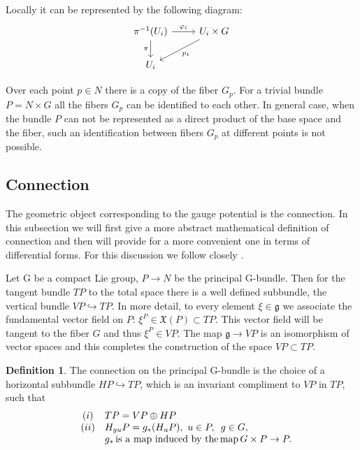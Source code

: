 \documentclass[11pt]{report}
\theoremstyle{plain}
\theoremstyle{definition}
\newtheorem{defn}[thm]{Definition}
\theoremstyle{remark}
\theoremstyle{remark}
\numberwithin{equation}{section}
\begin{document}
Locally it can be represented by the following diagram:
 \[
\begin{tikzcd}
\pi^{-1}(U_i) \arrow{r}{\varphi_i} \arrow[swap]{d}{\pi} & U_i\times G \arrow{dl}{p_1} \\
U_i
\end{tikzcd}
\]

Over each point $p\in N$ there is a copy of the fiber $G_p$. For a trivial bundle $P = N\times G$ all the fibers $G_p$ can be identified to each other. In general case, when the bundle $P$ can not be represented as a direct product of the base space and the fiber, such an identification between fibers $G_p$ at different points is not possible. 

\subsection{Connection}
The geometric object corresponding to the gauge potential is the connection. In this subsection we will first give a more abstract mathematical definition of connection and then will provide for a more convenient one in terms of differential forms. For this discussion we follow closely \cite{Nakahara}.

Let G be a compact Lie group, $P\to N$ be the principal G-bundle. Then for the tangent bundle $TP$ to the total space there is a well defined subbundle, the vertical bundle $VP\hookrightarrow TP$. In more detail,  to every element $\xi \in \mathfrak{g}$ we associate the fundamental vector field on $P$: $\xi^P \in \mathfrak{X}(P) \subset TP$. This vector field will be tangent to the fiber $G$ and thus $\xi^P \in VP$. The map $\mathfrak{g} \to VP$ is an isomorphism of vector spaces and this completes the construction of the space $VP \subset TP$. 

\begin{defn}\label{hor}
The connection on the principal G-bundle is the choice of a horizontal subbundle $HP \hookrightarrow TP$, which is an invariant compliment to $VP$ in $TP$, such that 
\[\begin{array}{lcl}
 &(i)  & TP = VP \oplus HP\\
 & (ii) & H_{gu}P = g_*(H_uP), \, \,  u\in P, \,\, \,  g\in G,\\
 & \,& g_* \, {\rm is \,  \, a  \, \, map \, \, induced \, \, by \, \,  the \, map} \, G \times P \to P.\\
 
 \end{array}\]
\end{defn}
\end{document}
